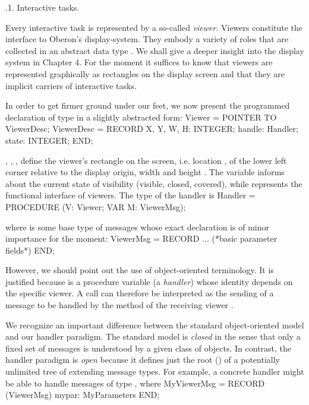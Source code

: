 .1. Interactive tasks.

Every interactive task is represented by a so-called \emph{viewer}. Viewers
constitute the interface to Oberon's display-system. They embody a
variety of roles that are collected in an abstract data type
. We shall give a deeper insight into the display system in
Chapter 4. For the moment it suffices to know that viewers are
represented graphically as rectangles on the display screen and that
they are implicit carriers of interactive tasks. 


In order to get firmer ground under our feet, we now present the programmed declaration of type  in a slightly abstracted form:
\begintt
Viewer = POINTER TO ViewerDesc;
ViewerDesc = RECORD
  X, Y, W, H: INTEGER;
  handle: Handler;
  state: INTEGER;
END;
\endtt

\noindent {}, , ,  define the viewer's rectangle on the screen, i.e. location
,  of the lower left corner relative to the display origin, width 
and height . The variable  informs about the current state of
visibility (visible, closed, covered), while  represents the
functional interface of viewers. The type of the handler is
\begintt
Handler = PROCEDURE (V: Viewer; VAR M: ViewerMsg);
\endtt

\noindent where  is some base type of messages whose exact declaration is of minor importance for the moment:
\begintt
ViewerMsg = RECORD ... (*basic parameter fields*) END;
\endtt

\noindent However, we should point out the use of object-oriented
terminology. It is justified because  is a procedure variable (a
\emph{handler}) whose identity depends on the specific viewer. A call
 can therefore be interpreted as the sending of a
message  to be handled by the method of the receiving viewer .

We recognize an important difference between the standard
object-oriented model and our handler paradigm. The standard model is
\emph{closed} in the sense that only a fixed set of messages is understood by
a given class of objects. In contrast, the handler paradigm is \emph{open}
because it defines just the root () of a potentially
unlimited tree of extending message types. For example, a concrete
handler might be able to handle messages of type , where
\begintt
MyViewerMsg = RECORD (ViewerMsg)
  mypar: MyParameters
END;
\endtt

